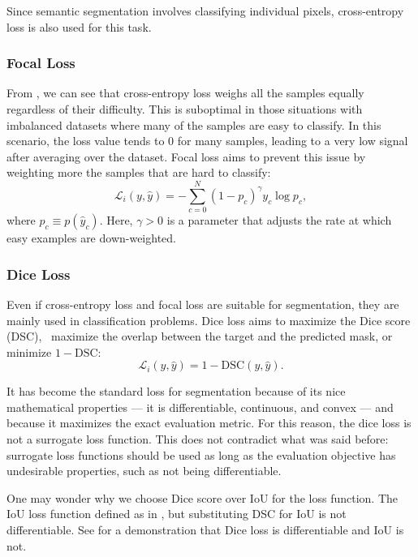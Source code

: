 Since semantic segmentation involves classifying individual pixels, cross-entropy loss is also used for this task.

\subsubsection{Focal Loss} From , we can see that cross-entropy loss weighs all the samples equally regardless of their difficulty. This is suboptimal in those situations with imbalanced datasets where many of the samples are easy to classify. In this scenario, the loss value tends to 0 for many samples, leading to a very low signal after averaging over the dataset. Focal loss aims to prevent this issue by weighting more the samples that are hard to classify:
\begin{equation}
    \mathcal{L}_i(y,\hat{y})= -\sum_{c=0}^N (1-p_c)^\gamma y_c\log p_c,
    \label{eq:focalloss}
\end{equation}
where $p_c \equiv p(\hat{y}_c)$. Here, $\gamma > 0$ is a parameter that adjusts the rate at which easy examples are down-weighted.

\subsubsection{Dice Loss} Even if cross-entropy loss and focal loss are suitable for segmentation, they are mainly used in classification problems. Dice loss aims to maximize the Dice score (DSC), \ie~maximize the overlap between the target and the predicted mask, or minimize $1 - \text{DSC}$:
\begin{equation}
    \mathcal{L}_i(y,\hat{y}) = 1 - \text{DSC}(y, \hat{y}).
    \label{eq:diceloss}
\end{equation}

It has become the standard loss for segmentation because of its nice mathematical properties --- it is differentiable, continuous, and convex --- and because it maximizes the exact evaluation metric. For this reason, the dice loss is not a surrogate loss function. This does not contradict what was said before: surrogate loss functions should be used as long as the evaluation objective has undesirable properties, such as not being differentiable. 

One may wonder why we choose Dice score over IoU for the loss function. The IoU loss function defined as in , but substituting DSC for IoU is not differentiable. See  for a demonstration that Dice loss is differentiable and IoU is not.

